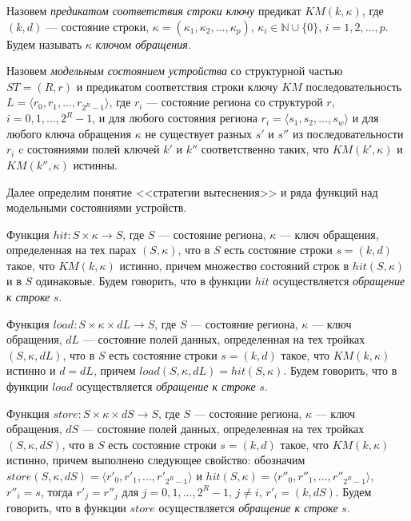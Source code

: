 Назовем \emph{предикатом соответствия строки ключу} предикат $KM(k, \kappa)$, где $(k,d)$ --- состояние строки, $\kappa = (\kappa_1, \kappa_2, ..., \kappa_p)$, $\kappa_i \in \mathbb{N} \cup \{0\}$, $i = 1, 2, ..., p$. Будем называть $\kappa$ \emph{ключом обращения}.

Назовем \emph{модельным состоянием устройства} со структурной частью $ST = (R, r)$ и предикатом соответствия строки ключу $KM$ последовательность $L = \langle r_0, r_1, ..., r_{2^R-1} \rangle$, где $r_i$ --- состояние региона со структурой $r$, $i = 0, 1, ..., 2^R{-}1$, и для любого состояния региона $r_i = \langle s_1, s_2, ..., s_w \rangle$ и для любого ключа обращения $\kappa$ не существует разных $s'$ и $s''$ из последовательности $r_i$ c состояниями полей ключей $k'$ и $k''$ соответственно таких, что $KM(k', \kappa)$ и $KM(k'', \kappa)$ истинны.



Далее определим понятие <<стратегии вытеснения>> и ряда функций над модельными состояниями устройств.

Функция $hit: S \times \kappa \rightarrow S$, где $S$ --- состояние региона, $\kappa$ --- ключ обращения, определенная на тех парах $(S, \kappa)$, что в $S$ есть состояние строки $s = (k,d)$ такое, что $KM(k, \kappa)$ истинно, причем множество состояний строк в $hit(S, \kappa)$ и в $S$ одинаковые. Будем говорить, что в функции $hit$ осуществляется \emph{обращение к строке} $s$.

Функция $load: S \times \kappa \times dL \rightarrow S$, где $S$ --- состояние региона, $\kappa$ --- ключ обращения, $dL$ --- состояние полей данных, определенная на тех тройках $(S, \kappa, dL)$, что в $S$ есть состояние строки $s = (k,d)$ такое, что $KM(k, \kappa)$ истинно и $d = dL$, причем $load(S, \kappa, dL) = hit(S, \kappa)$. Будем говорить, что в функции $load$ осуществляется \emph{обращение к строке} $s$.

Функция $store: S \times \kappa \times dS \rightarrow S$, где $S$ --- состояние региона, $\kappa$ --- ключ обращения, $dS$ --- состояние полей данных, определенная на тех тройках $(S, \kappa, dS)$, что в $S$ есть состояние строки $s = (k,d)$ такое, что $KM(k, \kappa)$ истинно, причем выполнено следующее свойство: обозначим $store(S, \kappa, dS) = \langle r'_0, r'_1, ..., r'_{2^R-1}\rangle$ и $hit(S, \kappa) = \langle r''_0, r''_1, ..., r''_{2^R-1}\rangle$, $r''_i = s$, тогда $r'_j = r''_j$ для $j = 0, 1, ..., 2^R{-}1$, $j \neq i$, $r'_i = (k, dS)$. Будем говорить, что в функции $store$ осуществляется \emph{обращение к строке} $s$.

